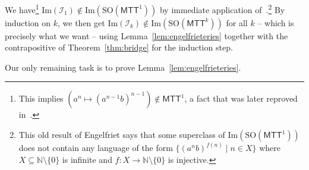 \documentclass{fundam}
\newcommand{\bbN}{\mathbb{N}}
\newcommand{\Image}{\mathrm{Im}}
\newcommand{\cI}{\mathcal{I}}
\newcommand{\MTT}{\mathsf{MTT}}
\newcommand{\SO}{\mathrm{SO}}
\theoremstyle{claimstyle}
\begin{document}
We have\footnote{This implies $(a^n \mapsto (a^{n-1}b)^{n-1})\notin\MTT^1$, a
  fact that was later reproved in~\cite[Theorem~8.1(a)]{NguyenNP21}.}
$\Image(\cI_1)\notin\Image(\SO(\MTT^1))$ by immediate application
of~\cite[Theorem~3.16]{Engelfriet82}.\footnote{This old result of Engelfriet says that some superclass of $\Image(\SO(\MTT^1))$ does not contain any language of the form $\{(a^n b)^{f(n)} \mid n \in X\}$ where $X \subseteq \bbN\setminus\{0\}$ is infinite and $f \colon X \to \bbN\setminus\{0\}$ is injective.} By induction on $k$, we then get $\Image(\cI_k)\notin\Image(\SO(\MTT^k))$ for all $k$ -- which is precisely what we want -- using Lemma~\ref{lem:engelfrieteries} together with the contrapositive of Theorem~\ref{thm:bridge} for the induction step.

Our only remaining task is to prove Lemma~\ref{lem:engelfrieteries}.
\end{document}
